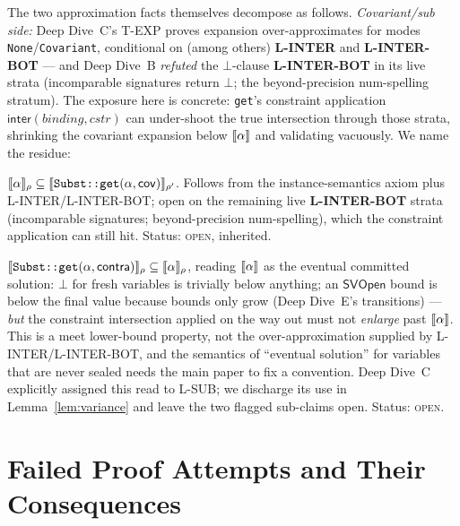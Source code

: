 \documentclass[11pt]{article}
\newcommand{\SVOpen}{\mathsf{SVOpen}}
\begin{document}
The two approximation facts themselves decompose as follows.
\emph{Covariant/sub side:} Deep Dive~C's T-EXP proves expansion
over-approximates for modes \texttt{None}/\texttt{Covariant},
conditional on (among others) \textbf{L-INTER} and
\textbf{L-INTER-BOT} --- and Deep Dive~B
\emph{refuted} the $\bot$-clause \textbf{L-INTER-BOT} in its live strata
(incomparable signatures return $\bot$; the beyond-precision
num-spelling stratum). The
exposure here is concrete: \texttt{get}'s constraint application
$\mathsf{inter}(\mathit{binding}, \mathit{cstr})$ can under-shoot the true
intersection through those strata, shrinking the covariant expansion below
$\llbracket \alpha \rrbracket$ and validating vacuously. We name the residue:

\begin{obligation}
\label{obl:getcov}
$\llbracket \alpha \rrbracket_\rho \subseteq
\llbracket \texttt{Subst::get}(\alpha, \mathsf{cov}) \rrbracket_{\rho'}$. Follows from
the instance-semantics axiom plus L-INTER/L-INTER-BOT; open on the remaining live
\textbf{L-INTER-BOT} strata (incomparable signatures;
beyond-precision num-spelling),
which the constraint application can still hit. Status: \textsc{open},
inherited.
\end{obligation}

\begin{obligation}
\label{obl:getcontra}
$\llbracket \texttt{Subst::get}(\alpha, \mathsf{contra}) \rrbracket_{\rho}
\subseteq \llbracket \alpha \rrbracket_{\rho}$, reading $\llbracket \alpha \rrbracket$ as the eventual
committed solution: $\bot$ for fresh variables is trivially below
anything; an $\SVOpen$ bound is below the final value because bounds
only grow (Deep Dive~E's transitions) --- \emph{but} the constraint
intersection applied on the way out must not \emph{enlarge} past
$\llbracket \alpha \rrbracket$. This is a meet lower-bound property, not the
over-approximation supplied by L-INTER/L-INTER-BOT, and the semantics of
``eventual solution'' for variables that are never sealed needs the main
paper to fix a convention. Deep Dive~C explicitly assigned this read to
L-SUB; we discharge its use in Lemma~\ref{lem:variance} and leave the
two flagged sub-claims open. Status: \textsc{open}.
\end{obligation}

\section{Failed Proof Attempts and Their Consequences}
\end{document}

